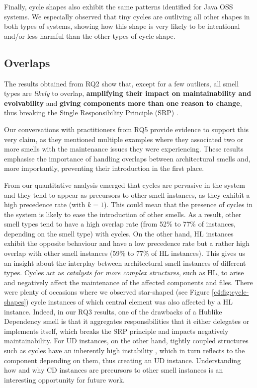 Finally, cycle shapes also exhibit the same patterns identified for Java OSS systems.
We especially observed that tiny cycles are outliving all other shapes in both types of systems, showing how this shape is very likely to be intentional and/or less harmful than the other types of cycle shape.

\subsection{Overlaps}
The results obtained from RQ2 show that, except for a few outliers, all smell types are \emph{likely} to overlap, \textbf{amplifying their impact on maintainability and evolvability} and \textbf{giving components more than one reason to change}, thus breaking the Single Responsibility Principle (SRP) \cite{Martin2018}. 

Our conversations with practitioners from RQ5 provide evidence to support this very claim, as they mentioned multiple examples where they associated two or more smells with the maintenance issues they were experiencing.
These results emphasise the importance of handling overlaps between architectural smells and, more importantly, preventing their introduction in the first place.

From our quantitative analysis emerged that cycles are pervasive in the system and they tend to appear as precursors to other smell instances, as they exhibit a high precedence rate (with $k = 1$).
This could mean that the presence of cycles in the system is likely to ease the introduction of other smells.
As a result, other smell types tend to have a high overlap rate (from 52\% to 77\% of instances, depending on the smell type) with cycles.
On the other hand, HL instances exhibit the opposite behaviour and have a low precedence rate but a rather high overlap with other smell instances (59\% to 77\% of HL instances).
This gives us an insight about the interplay between architectural smell instances of different types.
Cycles act as \emph{catalysts for more complex structures}, such as HL, to arise and negatively affect the maintenance of the affected components and files.
There were plenty of occasions where we observed star-shaped (see Figure \ref{c4:fig:cycle-shapes}) cycle instances of which central element was also affected by a HL instance.
Indeed, in our RQ3 results, one of the drawbacks of a Hublike Dependency smell is that it aggregates responsibilities that it either delegates or implements itself, which breaks the SRP principle and impacts negatively maintainability.
For UD instances, on the other hand, tightly coupled structures such as cycles have an inherently high instability \cite{Martin2018}, which in turn reflects to the component depending on them, thus creating an UD instance.
Understanding how and why CD instances are precursors to other smell instances is an interesting opportunity for future work.

